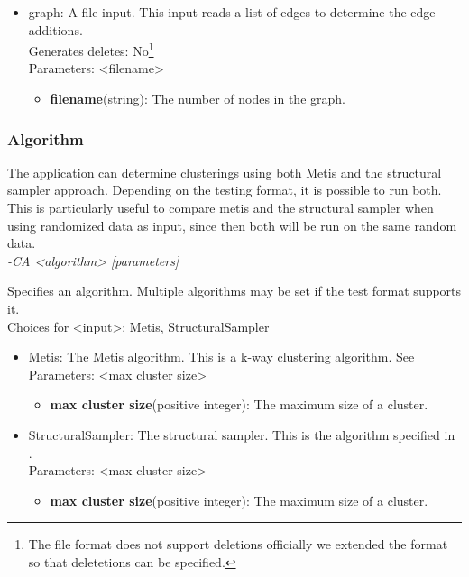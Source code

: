 \documentclass[a4paper]{article}
\begin{document}
\begin{itemize}
	\item graph: A file input. This input reads a list of edges to determine the edge additions. \\
	Generates deletes: No\footnote{The file format does not support deletions officially we extended the format so that deletetions can be specified.} \\
	Parameters: <filename>
	
	\begin{itemize}
		\item \textbf{filename}(string): The number of nodes in the graph.
	\end{itemize}
\end{itemize}

\subsubsection{Algorithm}
The application can determine clusterings using both Metis and the structural sampler approach. Depending on the testing format, it is possible to run both. This is particularly useful to compare metis and the structural sampler when using randomized data as input, since then both will be run on the same random data.\\

\emph{-CA <algorithm> [parameters]}

Specifies an algorithm. Multiple algorithms may be set if the test format supports it.\\
Choices for <input>: Metis, StructuralSampler

\begin{itemize}
	\item Metis: The Metis algorithm. This is a k-way clustering algorithm. See \cite{METIS} \\
	Parameters: <max cluster size>
	
	\begin{itemize}
		\item \textbf{max cluster size}(positive integer): The maximum size of a cluster.
	\end{itemize}
	
	\item StructuralSampler: The structural sampler. This is the algorithm specified in \cite{paper}. \\
	Parameters: <max cluster size>
	
	\begin{itemize}
		\item \textbf{max cluster size}(positive integer): The maximum size of a cluster.
	\end{itemize}
\end{itemize}
\end{document}

